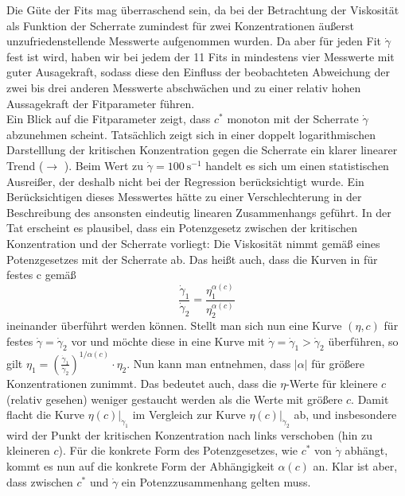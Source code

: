 \documentclass[11pt,a4paper,oneside]{scrartcl}
\begin{document}
Die Güte der Fits mag überraschend sein, da bei der Betrachtung der Viskosität als Funktion der Scherrate zumindest für zwei Konzentrationen äußerst unzufriedenstellende Messwerte aufgenommen wurden. Da aber für jeden Fit $\dot\gamma$ fest ist wird, haben wir bei jedem der 11 Fits in  mindestens vier Messwerte mit guter Ausagekraft, sodass diese den Einfluss der beobachteten Abweichung der zwei bis drei anderen Messwerte abschwächen und zu einer relativ hohen Aussagekraft der Fitparameter führen.\\
Ein Blick auf die Fitparameter zeigt, dass $c^*$ monoton mit der Scherrate $\dot\gamma$ abzunehmen scheint. Tatsächlich zeigt sich in einer doppelt logarithmischen Darstelllung der kritischen Konzentration gegen die Scherrate ein klarer linearer Trend ($\rightarrow$ ). Beim Wert zu $\dot\gamma=100\ \mathrm s^{-1}$ handelt es sich um einen statistischen Ausreißer, der deshalb nicht bei der Regression berücksichtigt wurde. Ein Berücksichtigen dieses Messwertes hätte zu einer Verschlechterung in der Beschreibung des ansonsten eindeutig linearen Zusammenhangs geführt.
In der Tat erscheint es plausibel, dass ein Potenzgesetz zwischen der kritischen Konzentration und der Scherrate vorliegt: Die Viskosität nimmt gemäß eines Potenzgesetzes mit der Scherrate ab. 
Das heißt auch, dass die Kurven in  für festes c gemäß \begin{equation}
\frac{\dot\gamma_1}{\dot\gamma_2}=\frac{\eta_1^{\alpha(c)}}{\eta_2^{\alpha(c)}}
\end{equation}
ineinander überführt werden können. Stellt man sich nun eine Kurve $(\eta,c)$ für festes $\dot\gamma=\dot\gamma_2$ vor und möchte diese in eine Kurve mit $\dot\gamma=\dot\gamma_1>\dot\gamma_2$ überführen, so gilt $\eta_1=\left(\frac{\dot\gamma_1}{\dot\gamma_2}\right)^{1/\alpha(c)}\cdot\eta_2$. Nun kann man  entnehmen, dass $|\alpha|$ für größere Konzentrationen zunimmt. Das bedeutet auch, dass die $\eta$-Werte für kleinere $c$ (relativ gesehen) weniger gestaucht werden als die Werte mit größere $c$. Damit flacht die Kurve $\eta (c)\big|_{\dot\gamma_1}$ im Vergleich zur Kurve 
$\eta (c)\big|_{\dot\gamma_2}$ ab, und insbesondere wird der Punkt der kritischen Konzentration nach links verschoben (hin zu kleineren $c$). Für die konkrete Form des Potenzgesetzes, wie $c^*$ von $\dot\gamma$ abhängt, kommt es nun auf die konkrete Form der Abhängigkeit $\alpha(c)$ an. Klar ist aber, dass zwischen $c^*$ und $\dot\gamma$ ein Potenzzusammenhang gelten muss.\par
\end{document}
